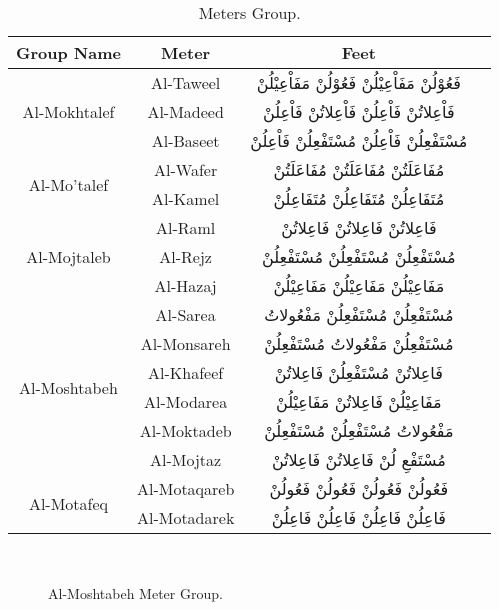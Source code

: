 \begin{itemize}
\begin{table}[t]
  \centering
  \begin{tabular}{c c c c}
    \toprule
    \textbf{Group Name} & \textbf{Meter}  & \textbf{Feet} \\
    \toprule
     \multirow{3}{*}{Al-Mokhtalef} & Al-Taweel & \textarabic{فَعُوْلُنْ مَفَاْعِيْلُنْ فَعُوْلُنْ مَفَاْعِيْلُنْ}\\
       & Al-Madeed&  \textarabic{فَاْعِلاتُنْ فَاْعِلُنْ فَاْعِلاتُنْ فَاْعِلُنْ}\\
       & Al-Baseet  & \textarabic{مُسْتَفْعِلُنْ فَاْعِلُنْ مُسْتَفْعِلُنْ فَاْعِلُنْ}\\
    \midrule
     \multirow{2}{*}{Al-Mo'talef} & Al-Wafer & \textarabic{مُفَاعَلَتُنْ مُفَاعَلَتُنْ مُفَاعَلَتُنْ}\\
       & Al-Kamel&  \textarabic{مُتَفَاعِلُنْ مُتَفَاعِلُنْ مُتَفَاعِلُنْ}\\
    \midrule
      \multirow{3}{*}{Al-Mojtaleb} & Al-Raml & \textarabic{فَاعِلاتُنْ فَاعِلاتُنْ فَاعِلاتُنْ}\\
       & Al-Rejz&  \textarabic{مُسْتَفْعِلُنْ مُسْتَفْعِلُنْ مُسْتَفْعِلُنْ}\\
       & Al-Hazaj  & \textarabic{مَفَاعِيْلُنْ مَفَاعِيْلُنْ مَفَاعِيْلُنْ}\\
    \midrule
      \multirow{6}{*}{Al-Moshtabeh} & Al-Sarea & \textarabic{مُسْتَفْعِلُنْ مُسْتَفْعِلُنْ مَفْعُولاتُ}\\
       & Al-Monsareh&  \textarabic{مُسْتَفْعِلُنْ مَفْعُولاتُ مُسْتَفْعِلُنْ}\\
       & Al-Khafeef  & \textarabic{فَاعِلاتُنْ مُسْتَفْعِلُنْ فَاعِلاتُنْ}\\
       & Al-Modarea  & \textarabic{مَفَاعِيْلُنْ فَاعِلاتُنْ مَفَاعِيْلُنْ}\\
       & Al-Moktadeb  & \textarabic{مَفْعُولاتُ مُسْتَفْعِلُنْ مُسْتَفْعِلُنْ}\\
       & Al-Mojtaz  & \textarabic{مُسْتَفْعِ لُنْ فَاعِلاتُنْ فَاعِلاتُنْ}\\
    \midrule
      \multirow{2}{*}{Al-Motafeq} & Al-Motaqareb & \textarabic{فَعُولُنْ فَعُولُنْ فَعُولُنْ فَعُولُنْ}\\
       & Al-Motadarek&  \textarabic{فَاعِلُنْ فَاعِلُنْ فَاعِلُنْ فَاعِلُنْ}\\
    \bottomrule                                           
  \end{tabular}
\caption{Meters Group.}\label{Tab:Meters_Group}
\end{table}%
\end{itemize}
%
\begin{figure}[h]
  \centering

\caption{Al-Moshtabeh Meter Group.}~\label{Fig:AlMoshtabeh}
\end{figure}%

